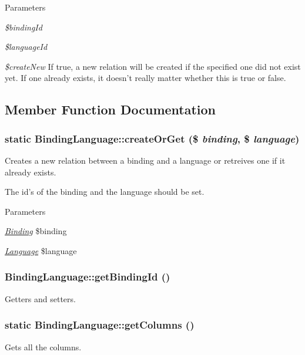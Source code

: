 \begin{DoxyParams}{Parameters}
\item[{\em \$bindingId}]\item[{\em \$languageId}]\item[{\em \$createNew}]If true, a new relation will be created if the specified one did not exist yet. If one already exists, it doesn't really matter whether this is true or false. \end{DoxyParams}


\subsection{Member Function Documentation}
\hypertarget{classBindingLanguage_a36d05494548bf935e2a19f7cf37237fc}{
\subsubsection[{createOrGet}]{\setlength{\rightskip}{0pt plus 5cm}static BindingLanguage::createOrGet (\$ {\em binding}, \/  \$ {\em language})}}
\label{classBindingLanguage_a36d05494548bf935e2a19f7cf37237fc}
Creates a new relation between a binding and a language or retreives one if it already exists.

The id's of the binding and the language should be set.


\begin{DoxyParams}{Parameters}
\item[{\em \hyperlink{classBinding}{Binding}}]\$binding \item[{\em \hyperlink{classLanguage}{Language}}]\$language \end{DoxyParams}
\hypertarget{classBindingLanguage_a3ddbcd10fe8a242eeac058c4f37b2363}{
\subsubsection[{getBindingId}]{\setlength{\rightskip}{0pt plus 5cm}BindingLanguage::getBindingId ()}}
\label{classBindingLanguage_a3ddbcd10fe8a242eeac058c4f37b2363}
Getters and setters. \hypertarget{classBindingLanguage_a98dcffedcdfc0ebe0701353fd2d17d06}{
\subsubsection[{getColumns}]{\setlength{\rightskip}{0pt plus 5cm}static BindingLanguage::getColumns ()}}
\label{classBindingLanguage_a98dcffedcdfc0ebe0701353fd2d17d06}
Gets all the columns.

